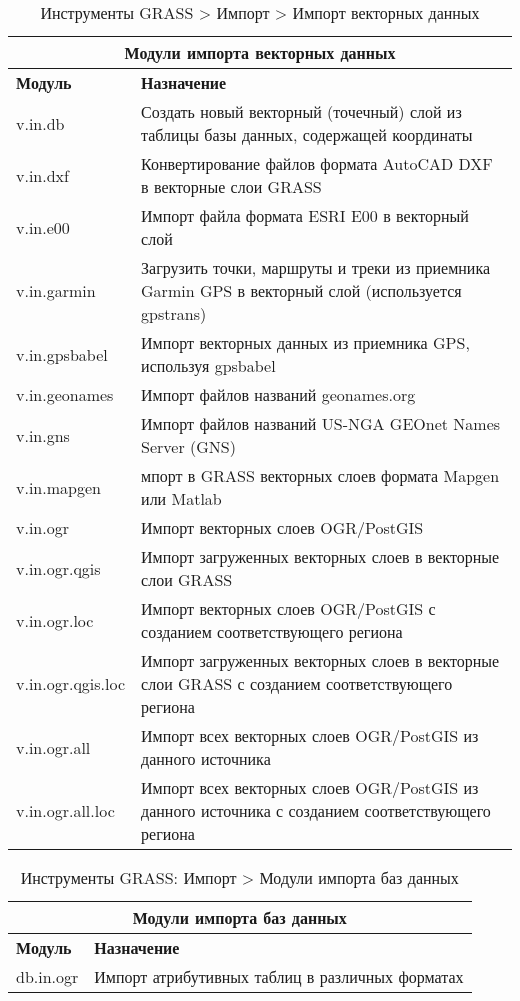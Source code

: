 {\renewcommand{\arraystretch}{0.7}
\begin{table}[htb]
\centering
 \begin{tabular}{|p{2.5cm}|p{11.5cm}|}
  \hline \multicolumn{2}{|c|}{\textbf{Модули импорта векторных данных}} \\
  \hline \textbf{Модуль} & \textbf{Назначение} \\
  \hline v.in.db & Создать новый векторный (точечный) слой из таблицы
  базы данных, содержащей координаты \\
  \hline v.in.dxf & Конвертирование файлов формата AutoCAD DXF в векторные
  слои GRASS \\
  \hline v.in.e00 & Импорт файла формата ESRI E00 в векторный слой \\
  \hline v.in.garmin & Загрузить точки, маршруты и треки из приемника
  Garmin GPS в векторный слой (используется gpstrans) \\
  \hline v.in.gpsbabel & Импорт векторных данных из приемника GPS,
  используя gpsbabel \\
  \hline v.in.geonames & Импорт файлов названий geonames.org \\
  \hline v.in.gns & Импорт файлов названий US-NGA GEOnet Names Server (GNS) \\
  \hline v.in.mapgen & мпорт в GRASS векторных слоев формата Mapgen
  или Matlab \\
  \hline v.in.ogr & Импорт векторных слоев OGR/PostGIS \\
  \hline v.in.ogr.qgis & Импорт загруженных векторных слоев в векторные
  слои GRASS \\
  \hline v.in.ogr.loc & Импорт векторных слоев OGR/PostGIS с созданием
  соответствующего региона \\
  \hline v.in.ogr.qgis.loc & Импорт загруженных векторных слоев в
  векторные слои GRASS с созданием соответствующего региона \\
  \hline v.in.ogr.all & Импорт всех векторных слоев OGR/PostGIS из
  данного источника \\
  \hline v.in.ogr.all.loc & Импорт всех векторных слоев OGR/PostGIS из
  данного источника с созданием соответствующего региона \\
\hline
\end{tabular}
\caption{Инструменты GRASS > Импорт > Импорт векторных данных}
\end{table}}

{\renewcommand{\arraystretch}{0.7}
\begin{table}[H]
\centering
 \begin{tabular}{|p{2.5cm}|p{11.5cm}|}
  \hline \multicolumn{2}{|c|}{\textbf{Модули импорта баз данных}} \\
  \hline \textbf{Модуль} & \textbf{Назначение} \\
  \hline db.in.ogr & Импорт атрибутивных таблиц в различных форматах \\
\hline
\end{tabular}
\caption{Инструменты GRASS: Импорт > Модули импорта баз данных}
\end{table}}

